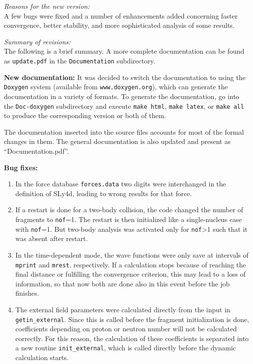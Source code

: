 \documentclass[final,1p,twocolumn]{elsarticle}
\begin{document}
\begin{small}
{\em Reasons for the new version:}\\
A few bugs were fixed and a number of enhancements added concerning
faster convergence, better stability, and more sophisticated analysis
of some results.

{\em Summary of revisions:}\\
The following is a brief summary. A more complete documentation can be
found as {\tt update.pdf} in the {\tt Documentation} subdirectory.

{\bf New documentation:} It was decided to switch the documentation to using the {\tt
    Doxygen} system (available from {\tt www.doxygen.org}), which can
  generate the documentation in a variety of formats. To generate the
  documentation, go into the {\tt Doc-doxygen} subdirectory and
  execute {\tt make html}, {\tt make latex}, or {\tt make all} to
  produce the corresponding version or both of them.

  The documentation inserted into the source files accounts for most
  of the formal changes in them. The general documentation is also
  updated and present as ``Documentation.pdf''.

 {\bf Bug fixes:} 
\begin{enumerate}
\item In the force database {\tt forces.data} two digits were
  interchanged in the definition of SLy4d, leading to wrong results
  for that force.

\item If a restart is done for a two-body collision, the code changed
  the number of fragments to {\tt nof}=1. The restart is then
  initialized like a single-nucleus case with  {\tt nof}=1. But two-body
  analysis was activated only for {\tt nof}>1 such that it was absent
  after restart.

\item In the time-dependent mode, the wave functions were only save at
  intervals of {\tt mprint} and {\tt mrest}, respectively. If a
  calculation stops because of reaching the final distance or
  fulfilling the convergence criterion, this may lead to a loss of
  information, so that now both are done also in this event before the
  job finishes.

\item The external field parameters were calculated directly from the
  input in {\tt getin\_external}. Since this is called before the
  fragment initialization is done, coefficients depending on proton or
  neutron number will not be calculated correctly. For this reason,
  the calculation of these coefficients is separated into a new
  routine {\tt init\_external}, which is called directly before the
  dynamic calculation starts.
\end{enumerate}


\end{small}
\end{document}
